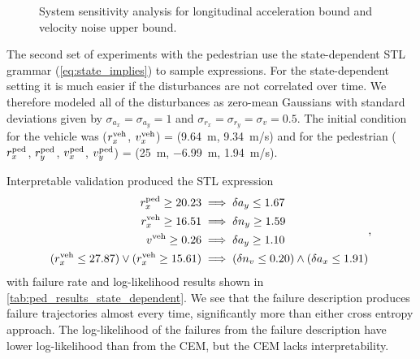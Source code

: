 \begin{figure}
    \centering
    
    \caption{System sensitivity analysis for longitudinal acceleration bound and velocity noise upper bound.}
    \label{fig:stl_ped_sensititivty}
\end{figure}

The second set of experiments with the pedestrian use the state-dependent STL grammar (\cref{eq:state_implies}) to sample expressions. For the state-dependent setting it is much easier if the disturbances are not correlated over time. We therefore modeled all of the disturbances as zero-mean Gaussians with standard deviations given by $\sigma_{a_x} = \sigma_{a_y} = 1$ and $\sigma_{r_x} = \sigma_{r_y} = \sigma_{v} = 0.5$. The initial condition for the vehicle was ($r_x^{\rm veh}$, $v_x^{\rm veh}$) = (\SI{9.64}{m}, \SI{9.34}{m/s}) and for the pedestrian ($r^{\rm ped}_x$, $r^{\rm ped}_y$, $v^{\rm ped}_x$, $v^{\rm ped}_y$) = (\SI{25}{m}, \SI{-6.99}{m}, \SI{1.94}{m/s}). 

Interpretable validation produced the STL expression
\begin{equation}
\begin{split}
r_x^{\rm ped} \geq 20.23 &\implies \delta a_y \leq 1.67 \\
r_x^{\rm veh} \geq 16.51 &\implies \delta n_y \geq 1.59 \\
v^{\rm veh} \geq 0.26 &\implies \delta a_y \geq 1.10 \\
(r_x^{\rm veh} \leq 27.87) \lor (r_x^{\rm veh} \geq 15.61) &\implies (\delta n_v \leq 0.20) \land (\delta a_x \leq 1.91)
\end{split} \label{eq:failure_description_ped_state_dep} \text{,}
\end{equation}
with failure rate and log-likelihood results shown in \cref{tab:ped_results_state_dependent}. We see that the failure description produces failure trajectories almost every time, significantly more than either cross entropy approach. The log-likelihood of the failures from the failure description have lower log-likelihood than from the CEM, but the CEM lacks interpretability. 

